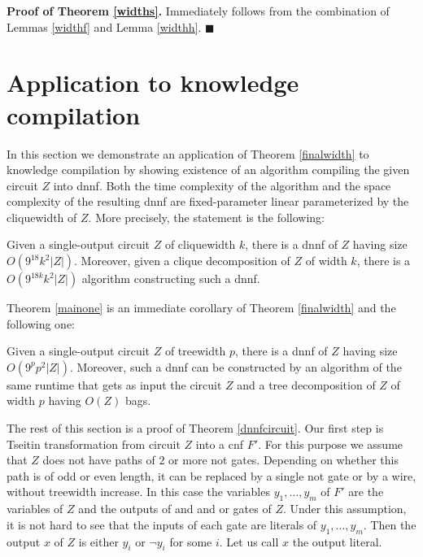\documentclass{llncs}
\begin{document}
{\bf Proof of Theorem \ref{widths}.}
Immediately follows from the combination of
Lemmas \ref{widthf} and Lemma \ref{widthh}. 
$\blacksquare$ 



\section{Application to knowledge compilation}
In this section we demonstrate an application of Theorem \ref{finalwidth} to knowledge compilation
by showing existence of an algorithm compiling the given circuit $Z$ into {\sc dnnf}. Both the time
complexity of the algorithm and the space complexity of the resulting {\sc dnnf} are fixed-parameter linear
parameterized by the cliquewidth of $Z$. More precisely, the statement is the following:

\begin{theorem} \label{mainone}
Given a single-output circuit $Z$ of cliquewidth $k$,
there is a {\sc dnnf} of $Z$  having size $O(9^{18}k^2|Z|)$.
Moreover, given a clique decomposition of $Z$ of width $k$, there is a 
$O(9^{18k}k^2|Z|)$ algorithm constructing such a {\sc dnnf}.
\end{theorem}

Theorem \ref{mainone} is an immediate corollary of Theorem \ref{finalwidth} and the following one:
\begin{theorem} \label{dnnfcircuit}
Given a single-output circuit $Z$ of treewidth $p$, there is  a {\sc dnnf} of $Z$ having size $O(9^pp^2|Z|)$.
Moreover, such a {\sc dnnf} can be constructed by an algorithm of the same runtime that gets
as input the circuit $Z$ and a tree decomposition of $Z$ of width $p$ having $O(Z)$ bags.
\end{theorem}


The rest of this section is a proof of Theorem \ref{dnnfcircuit}.
Our first step is Tseitin transformation from circuit $Z$ into a {\sc cnf} $F'$.
For this purpose we assume that $Z$ does not have paths of $2$ or more {\sc not} gates.
Depending on whether this path is of odd or even length, it can be replaced by a single
{\sc not} gate or by a wire, without treewidth increase. In this case the variables $y_1, \dots, y_m$
of $F'$ are the variables of $Z$ and the outputs of {\sc and} and {\sc or} gates of $Z$.
Under this assumption, it is not hard to see that the inputs of each gate are literals 
of $y_1, \dots, y_m$. Then the output $x$ of $Z$ is either $y_i$ or $\neg y_i$ for some $i$.
Let us call $x$ the output literal. 
\end{document}
